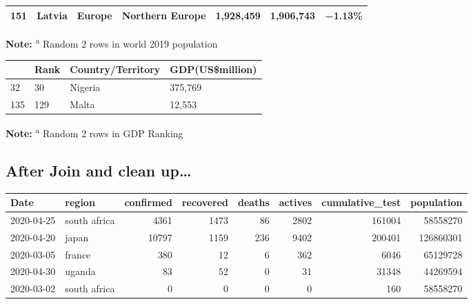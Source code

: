 \documentclass[
  11pt,
]{article}
\begin{document}
\begin{longtable}[]{@{}lllllll@{}}
\begin{minipage}[t]{0.03\columnwidth}
151\strut
\end{minipage} & \begin{minipage}[t]{0.11\columnwidth}\raggedright
Latvia\strut
\end{minipage} & \begin{minipage}[t]{0.16\columnwidth}\raggedright
Europe\strut
\end{minipage} & \begin{minipage}[t]{0.16\columnwidth}\raggedright
Northern Europe\strut
\end{minipage} & \begin{minipage}[t]{0.16\columnwidth}\raggedright
1,928,459\strut
\end{minipage} & \begin{minipage}[t]{0.16\columnwidth}\raggedright
1,906,743\strut
\end{minipage} & \begin{minipage}[t]{0.05\columnwidth}\raggedright
−1.13\%\strut
\end{minipage}\tabularnewline
\bottomrule
\end{longtable}

\textbf{Note:} \textsuperscript{a} Random 2 rows in world 2019
population

\begin{longtable}[]{@{}llll@{}}
\toprule
& Rank & Country/Territory & GDP(US\$million)\tabularnewline
\midrule
\endhead
32 & 30 & Nigeria & 375,769\tabularnewline
135 & 129 & Malta & 12,553\tabularnewline
\bottomrule
\end{longtable}

\textbf{Note:} \textsuperscript{a} Random 2 rows in GDP Ranking

\hypertarget{after-join-and-clean-up}{%
\subsection{After Join and clean
up\ldots{}}\label{after-join-and-clean-up}}

\begin{longtable}[]{@{}llrrrrrr@{}}
\toprule
Date & region & confirmed & recovered & deaths & actives &
cumulative\_test & population\tabularnewline
\midrule
\endhead
2020-04-25 & south africa & 4361 & 1473 & 86 & 2802 & 161004 &
58558270\tabularnewline
2020-04-20 & japan & 10797 & 1159 & 236 & 9402 & 200401 &
126860301\tabularnewline
2020-03-05 & france & 380 & 12 & 6 & 362 & 6046 &
65129728\tabularnewline
2020-04-30 & uganda & 83 & 52 & 0 & 31 & 31348 & 44269594\tabularnewline
2020-03-02 & south africa & 0 & 0 & 0 & 0 & 160 &
58558270\tabularnewline
\bottomrule
\end{longtable}
\end{document}
